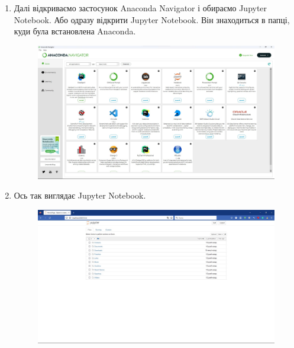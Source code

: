 \documentclass[a4paper,12pt]{article}
\begin{document}
\begin{enumerate}
\newpage
        \item Далі відкриваємо застосунок Anaconda Navigator і обираємо Jupyter Notebook. Або одразу відкрити Jupyter Notebook. Він знаходиться в папці, 
        куди була встановлена Anaconda.
        \begin{figure}[h!]
            \begin{center}
                \includegraphics[scale=0.35]{Prt sc/Figure_3.jpg}
            \end{center}
        \end{figure}
        \item Ось так виглядає Jupyter Notebook.
        \begin{figure}[h!]
            \begin{center}
                \includegraphics[scale=0.35]{Prt sc/Figure_4.jpg}
            \end{center}
        \end{figure}
    \end{enumerate}

\newpage
\end{document}

